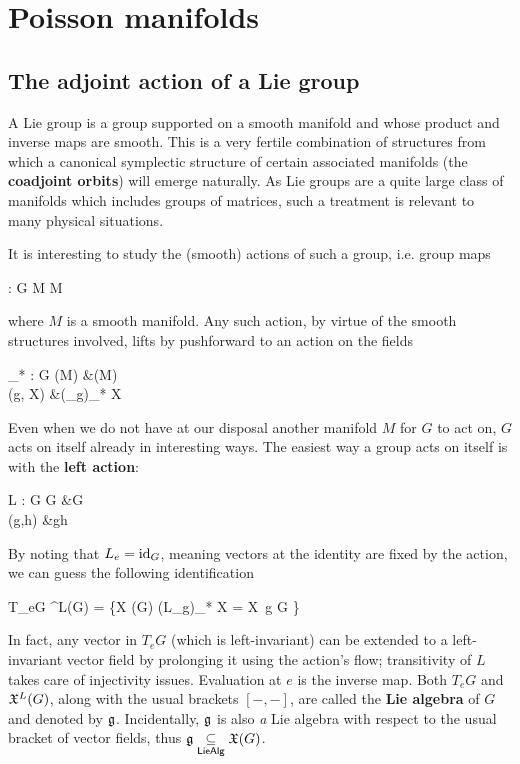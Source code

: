 \documentclass[main.tex]{subfiles}
\begin{document}
\chapter{Poisson manifolds}
\section{The adjoint action of a Lie group}
A Lie group is a group supported on a smooth manifold and whose product and inverse maps are smooth. This is a very fertile combination of structures from which a canonical symplectic structure of certain associated manifolds (the \textbf{coadjoint orbits}) will emerge naturally. As Lie groups are a quite large class of manifolds which includes groups of matrices, such a treatment is relevant to many physical situations.

It is interesting to study the (smooth) actions of such a group, i.e. group maps
\begin{eqalign}
	\rho : G \times M \longto M
\end{eqalign}
where $M$ is a smooth manifold. Any such action, by virtue of the smooth structures involved, lifts by pushforward to an action on the fields
\begin{eqalign}
	\rho_* : G \times \fields(M) &\longto \fields(M)\\
		(g, X) &\longmapsto (\rho_g)_* X
\end{eqalign}

Even when we do not have at our disposal another manifold $M$ for $G$ to act on, $G$ acts on itself already in interesting ways. The easiest way a group acts on itself is with the \textbf{left action}:
\begin{eqalign}
	L : G \times G &\longto G\\
	(g,h) &\longmapsto gh
\end{eqalign}
By noting that $L_e = \mathrm{id}_G$, meaning vectors at the identity are fixed by the action, we can guess the following identification
\begin{eqalign}
	T_eG \iso \fields^L(G) = \{X \in \fields(G) \suchthat (L_g)_* X = X\ \forall g \in G \}
\end{eqalign}
In fact, any vector in $T_e G$ (which is left-invariant) can be extended to a left-invariant vector field by prolonging it using the action's flow; transitivity of $L$ takes care of injectivity issues. Evaluation at $e$ is the inverse map. Both $T_eG$ and $\mathfrak{X}^L(G)$, along with the usual brackets $[-,-]$, are called the \textbf{Lie algebra} of $G$ and denoted by $\mathfrak g$. Incidentally, $\mathfrak g$ is also \emph{a} Lie algebra with respect to the usual bracket of vector fields, thus $\mathfrak g \underset{\mathsf{LieAlg}}{\subseteq} \mathfrak{X}(G)$.
\end{document}

